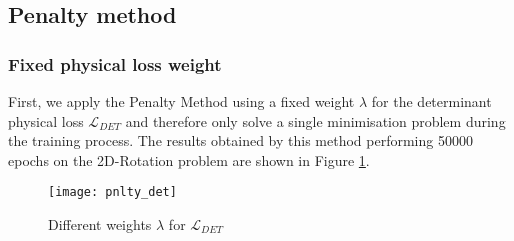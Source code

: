 \subsection{Penalty method}
\subsubsection{Fixed physical loss weight}
First, we apply the Penalty Method using a fixed weight $\lambda$ for the determinant physical loss $\mathcal{L}_{DET}$ and therefore only solve a single minimisation problem during the training process. The results obtained by this method performing 50000 epochs on the 2D-Rotation problem are shown in Figure \ref{fig:pnlty_det}.

\begin{figure}[ht]
	\texttt{[image: pnlty\_det]}
	\caption{Different weights $\lambda$ for $\mathcal{L}_{DET}$}
	\label{fig:pnlty_det}
\end{figure}


